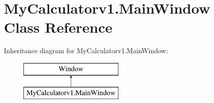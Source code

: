 \hypertarget{class_my_calculatorv1_1_1_main_window}{}\section{My\+Calculatorv1.\+Main\+Window Class Reference}
\label{class_my_calculatorv1_1_1_main_window}
Inheritance diagram for My\+Calculatorv1.\+Main\+Window\+:\begin{figure}[H]
\begin{center}
\leavevmode
\includegraphics[height=2.000000cm]{class_my_calculatorv1_1_1_main_window}
\end{center}
\end{figure}
